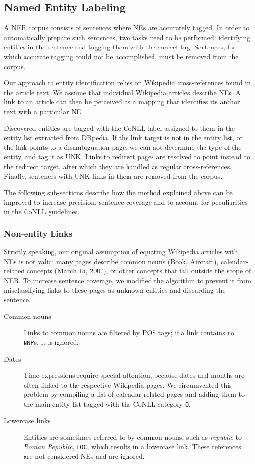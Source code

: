 \documentclass[11pt]{article}
\begin{document}
\subsection{Named Entity Labeling}

A NER corpus consists of sentences where NEs are accurately tagged. In order to automatically prepare such sentences, two tasks need to be performed: identifying entities in the sentence and tagging them with the correct tag. Sentences, for which accurate tagging could not be accomplished, must be removed from the corpus.

Our approach to entity identification relies on Wikipedia cross-references found in the article text. We assume that individual Wikipedia articles describe NEs. A link to an article can then be perceived as a mapping that identifies its anchor text with a particular NE.

Discovered entities are tagged with the CoNLL label assigned to them in the entity list extracted from DBpedia. If the link target is not in the entity list, or the link points to a disambiguation page, we can not determine the type of the entity, and tag it as UNK. Links to redirect pages are resolved to point instead to the redirect target, after which they are handled as regular cross-references. Finally, sentences with UNK links in them are removed from the corpus.

The following sub-sections describe how the method explained above can be improved to increase precision, sentence coverage and to account for peculiarities in the CoNLL guidelines.

\subsubsection{Non-entity Links}

Strictly speaking, our original assumption of equating Wikipedia articles with NEs is not valid: many pages describe common nouns (Book, Aircraft), calendar-related concepts (March 15, 2007), or other concepts that fall outside the scope of NER. To increase sentence coverage, we modified the algorithm to prevent it from misclassifying links to these pages as unknown entities and discarding the sentence.

\begin{description}
\item[Common nouns] Links to common nouns are filtered by POS tags; if a link contains no \texttt{NNP}s, it is ignored.
\item[Dates] Time expressions require special attention, because dates and months are often linked to the respective Wikipedia pages. We circumvented this problem by compiling a list of calendar-related pages and adding them to the main entity list tagged with the CoNLL category \texttt{O}. 
\item[Lowercase links] Entities are sometimes referred to by common nouns, such as \textit{republic} to \textit{Roman Republic}, \texttt{LOC}, which results in a lowercase link. These references are not considered NEs and are ignored.
\end{description}
\end{document}
